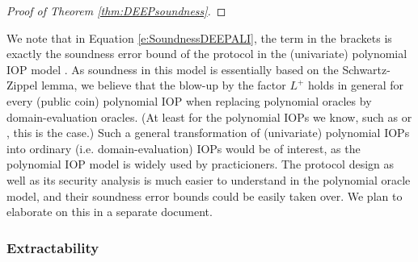 \documentclass[11pt]{article}
\theoremstyle{definition}
\theoremstyle{remark}
\begin{document}
\begin{proof}[Proof of Theorem \ref{thm:DEEPsoundness}]
\end{proof}

We note that in Equation \eqref{e:SoundnessDEEPALI}, the term in the brackets is exactly the soundness error bound of the protocol in the (univariate) polynomial IOP model \cite{DARK}.
As soundness in this model is essentially based on the Schwartz-Zippel lemma, we believe that the blow-up by the factor $L^+$ holds in general for every (public coin) polynomial IOP when replacing polynomial oracles by domain-evaluation oracles. 
(At least for the polynomial IOPs we know, such as \cite{Plonk, Sonic, Marlin} or \cite{Darlin}, this is the case.)
Such a general transformation of (univariate) polynomial IOPs into ordinary (i.e. domain-evaluation) IOPs would be of interest, as the polynomial IOP model is widely used by practicioners.   
The protocol design as well as its security analysis is much easier to understand in the polynomial oracle model, and their soundness error bounds could be easily taken over.
We plan to elaborate on this in a separate document.


\subsubsection{Extractability}
\end{document}
